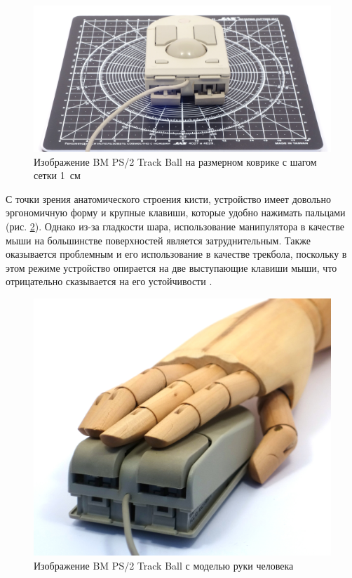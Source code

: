 \documentclass[11pt, a4paper]{article}
\begin{document}
\begin{figure}[h]
    \centering
    \includegraphics[scale=0.5]{1992_ibm_convertible/size_30.jpg}
    \caption{Изображение BM PS/2 Track Ball на размерном коврике с шагом сетки 1~см}
    \label{fig:IBMConvertibleSize}
\end{figure}

С точки зрения анатомического строения кисти, устройство имеет довольно эргономичную  форму и крупные клавиши, которые удобно нажимать пальцами (рис. \ref{fig:IBMConvertibleHand}). Однако из-за гладкости шара, использование манипулятора в качестве мыши на большинстве поверхностей является  затруднительным. Также оказывается проблемным и его использование в качестве трекбола, поскольку в этом режиме устройство опирается на две выступающие клавиши мыши, что отрицательно сказывается на его устойчивости \cite{IBM}.

\begin{figure}[h]
    \centering
    \includegraphics[scale=0.45]{1992_ibm_convertible/hand_60.jpg}
    \caption{Изображение BM PS/2 Track Ball с моделью руки человека}
    \label{fig:IBMConvertibleHand}
\end{figure}
\end{document}
